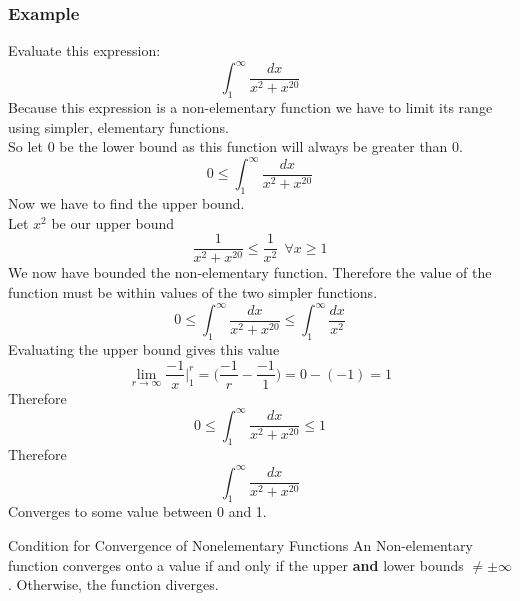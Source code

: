 \documentclass[letterpaper,10pt,twoside,twocolumn,openany]{book}
\begin{document}
\subsubsection{Example}
Evaluate this expression:
$$
    \int_1^\infty \frac{dx}{x^2+x^{20}}
$$
Because this expression is a non-elementary function we have to limit its range using simpler, elementary functions.\\
So let 0 be the lower bound as this function will always be greater than 0.
$$
    0 \leq \int_1^\infty \frac{dx}{x^2+x^{20}}
$$
Now we have to find the upper bound.\\ 
Let $x^2$ be our upper bound
$$
    \frac{1}{x^2 + x^{20}} \leq \frac{1}{x^2}\ \  \forall x \geq 1
$$
We now have bounded the non-elementary function. Therefore the value of the function must be within values of the two simpler functions.
$$
    0 \leq \int_1^\infty \frac{dx}{x^2+x^{20}} \leq \int_1^\infty \frac{dx}{x^2}
$$
Evaluating the upper bound gives this value
$$
    \lim_{r \to \infty} \frac{-1}{x}\biggl|_1^r = \biggl(\frac{-1}{r} - \frac{-1}{1}\biggl) = 0 - (-1) = 1
$$
Therefore
\newpage
$$
    0 \leq \int_1^\infty \frac{dx}{x^2+x^{20}} \leq 1
$$
Therefore
$$
    \int_1^\infty \frac{dx}{x^2+x^{20}}
$$
Converges to some value between 0 and 1.

\begin{paperbox}{Condition for Convergence of Nonelementary Functions}
    An Non-elementary function converges onto a value if and only if the upper \textbf{and} lower bounds $\neq \pm \infty$. Otherwise, the function diverges.
\end{paperbox}
\end{document}
